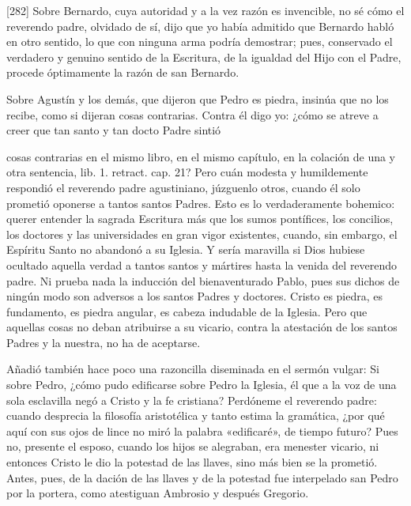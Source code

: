 [282] Sobre Bernardo, cuya autoridad y a la vez razón es invencible, no sé cómo el reverendo padre, olvidado de sí, dijo que yo había admitido que Bernardo habló en otro sentido, lo que con ninguna arma podría demostrar; pues, conservado el verdadero y genuino sentido de la Escritura, de la igualdad del Hijo con el Padre, procede óptimamente la razón de san Bernardo.

Sobre Agustín y los demás, que dijeron que Pedro es piedra, insinúa que no los recibe, como si dijeran cosas contrarias. Contra él digo yo: ¿cómo se atreve a creer que tan santo y tan docto Padre sintió

cosas contrarias en el mismo libro, en el mismo capítulo, en la colación de una y otra sentencia, lib. 1. retract. cap. 21? Pero cuán modesta y humildemente respondió el reverendo padre agustiniano, júzguenlo otros, cuando él solo prometió oponerse a tantos santos Padres. Esto es lo verdaderamente bohemico: querer entender la sagrada Escritura más que los sumos pontífices, los concilios, los doctores y las universidades en gran vigor existentes, cuando, sin embargo, el Espíritu Santo no abandonó a su Iglesia. Y sería maravilla si Dios hubiese ocultado aquella verdad a tantos santos y mártires hasta la venida del reverendo padre. Ni prueba nada la inducción del bienaventurado Pablo, pues sus dichos de ningún modo son adversos a los santos Padres y doctores. Cristo es piedra, es fundamento, es piedra angular, es cabeza indudable de la Iglesia. Pero que aquellas cosas no deban atribuirse a su vicario, contra la atestación de los santos Padres y la nuestra, no ha de aceptarse.

Añadió también hace poco una razoncilla diseminada en el sermón vulgar: Si sobre Pedro, ¿cómo pudo edificarse sobre Pedro la Iglesia, él que a la voz de una sola esclavilla negó a Cristo y la fe cristiana? Perdóneme el reverendo padre: cuando desprecia la filosofía aristotélica y tanto estima la gramática, ¿por qué aquí con sus ojos de lince no miró la palabra «edificaré», de tiempo futuro? Pues no, presente el esposo, cuando los hijos se alegraban, era menester vicario, ni entonces Cristo le dio la potestad de las llaves, sino más bien se la prometió. Antes, pues, de la dación de las llaves y de la potestad fue interpelado san Pedro por la portera, como atestiguan Ambrosio y después Gregorio.

